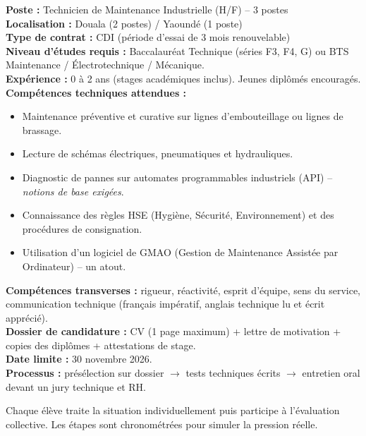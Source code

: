\documentclass[11pt]{article}
\newcounter{popsec}
\newcounter{popsub}
\newcommand{\courssub}[1]{%
  \stepcounter{popsub}%
  \par\vspace{9pt}\noindent{\popxbold\fontsize{11.5}{13}\selectfont\color{popink}{\color{poporange}\thepopsec.\thepopsub}\hspace{6pt}#1}\par\nopagebreak\vspace{4pt}
}
\begin{document}
\begin{exemplebox}
\textbf{Poste :} Technicien de Maintenance Industrielle (H/F) -- 3 postes \\
\textbf{Localisation :} Douala (2 postes) / Yaoundé (1 poste) \\
\textbf{Type de contrat :} CDI (période d'essai de 3 mois renouvelable) \\
\textbf{Niveau d'études requis :} Baccalauréat Technique (séries F3, F4, G) ou BTS Maintenance / Électrotechnique / Mécanique. \\
\textbf{Expérience :} 0 à 2 ans (stages académiques inclus). Jeunes diplômés encouragés. \\
\textbf{Compétences techniques attendues :}
\begin{itemize}
    \item Maintenance préventive et curative sur lignes d'embouteillage ou lignes de brassage.
    \item Lecture de schémas électriques, pneumatiques et hydrauliques.
    \item Diagnostic de pannes sur automates programmables industriels (API) -- \emph{notions de base exigées}.
    \item Connaissance des règles HSE (Hygiène, Sécurité, Environnement) et des procédures de consignation.
    \item Utilisation d'un logiciel de GMAO (Gestion de Maintenance Assistée par Ordinateur) -- un atout.
\end{itemize}
\textbf{Compétences transverses :} rigueur, réactivité, esprit d'équipe, sens du service, communication technique (français impératif, anglais technique lu et écrit apprécié). \\
\textbf{Dossier de candidature :} CV (1 page maximum) + lettre de motivation + copies des diplômes + attestations de stage. \\
\textbf{Date limite :} 30 novembre 2026. \\
\textbf{Processus :} présélection sur dossier $\rightarrow$ tests techniques écrits $\rightarrow$ entretien oral devant un jury technique et RH.
\end{exemplebox}

\courssub{Consignes}
Chaque élève traite la situation individuellement puis participe à l'évaluation collective. Les étapes sont chronométrées pour simuler la pression réelle.
\end{document}
